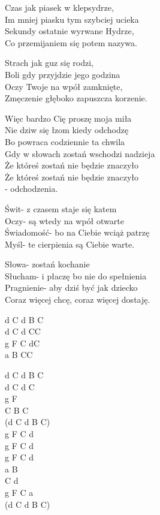 \begin{text}
    Czas jak piasek w klepsydrze,\\
    Im mniej piasku tym szybciej ucieka\\
    Sekundy ostatnie wyrwane Hydrze,\\
    Co przemijaniem się potem nazywa.

    Strach jak guz się rodzi,\\
    Boli gdy przyjdzie jego godzina\\
    Oczy Twoje na wpół zamknięte,\\
    Zmęczenie głęboko zapuszcza korzenie.

    Więc bardzo Cię proszę moja miła\\
    Nie dziw się łzom kiedy odchodzę\\
    Bo powraca codziennie ta chwila\\
    Gdy w słowach zostań wschodzi nadzieja\\
    Że któreś zostań nie będzie znaczyło\\
    Że któreś zostań nie będzie znaczyło\\
    - odchodzenia.

    Świt- z czasem staje się katem\\
    Oczy- są wtedy na wpół otwarte\\
    Świadomość- bo na Ciebie wciąż patrzę\\
    Myśl- te cierpienia są Ciebie warte.

    Słowa- zostań kochanie\\
    Słucham- i płaczę bo nie do spełnienia\\
    Pragnienie- aby dziś być jak dziecko\\
    Coraz więcej chcę, coraz więcej dostaję.
\end{text}
\begin{chord}
    d C d B C\\
    d C	d CC\\
    g F	C dC\\
    a B	CC

    d C	d B C\\
    d C	d C\\
    g F\\
    C B	C\\
    (d C d B C)\\
    g F	C d\\
    g F	C d\\
    g F	C d\\
    a B\\
    C d\\
    g F	C a\\
    (d C d B C)
\end{chord}